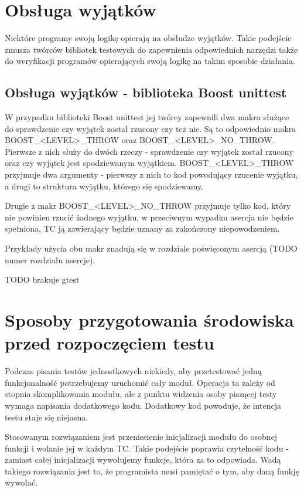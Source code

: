 \documentclass[12pt,a4paper,notitlepage]{report}
\begin{document}
\chapter{Obsługa wyjątków}

Niektóre programy swoją logikę opierają na obsłudze wyjątków. Takie podejście zmusza twórców bibliotek testowych do zapewnienia odpowiednich narzędzi także do weryfikacji programów opierających swoją logikę na takim sposobie działania. 

\section{Obsługa wyjątków - biblioteka Boost unittest}

W przypadku biblioteki Boost unittest jej twórcy zapewnili dwa makra służące do sprawdzenie czy wyjątek został rzucony czy też nie. Są to odpowiednio makra BOOST{\_}<LEVEL>{\_}THROW oraz BOOST{\_}<LEVEL>{\_}NO{\_}THROW. Pierwsze z nich służy do dwóch rzeczy - sprawdzenie czy wyjątek został rzucony oraz czy wyjątek jest spodziewanym wyjątkiem. BOOST{\_}<LEVEL>{\_}THROW przyjmuje dwa argumenty - pierwszy z nich to kod powodujący rzucenie wyjątku, a drugi to struktura wyjątku, którego się spodziewamy. 

Drugie z makr BOOST{\_}<LEVEL>{\_}NO{\_}THROW przyjmuje tylko kod, który nie powinien rzucić żadnego wyjątku, w przeciwnym wypadku asercja nie będzie spełniona, TC ją zawierający będzie uznany za zakończony niepowodzeniem.

Przykłady użycia obu makr znadują się w rozdziale poświęconym asercją (TODO numer rozdziału asercje).

TODO brakuje gtest

\chapter{Sposoby przygotowania środowiska przed rozpoczęciem testu}

Podczas pisania testów jednostkowych niekiedy, aby przetestować jedną funkcjonalność potrzebujemy uruchomić cały moduł. Operacja ta zależy od stopnia skomplikowania modułu, ale z punktu widzenia osoby piszącej testy wymaga napisania dodatkowego kodu. Dodatkowy kod powoduje, że intencja testu staje się niejasna. 

Stosowanym rozwiązaniem jest przeniesienie inicjalizacji modułu do osobnej funkcji i wolanie jej w każdym TC. Takie podejście poprawia czytelność kodu - zamiast całej inicjalizacji wywołujemy funkcje, która za to odpowiada. Wadą takiego rozwiązania jest to, że programista musi pamiętać o tym, aby daną funkję wywołać.
\end{document}
